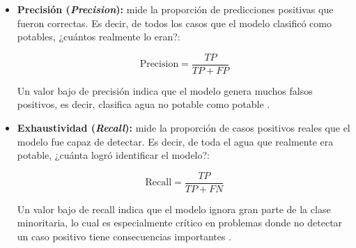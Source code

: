 \begin{itemize}
    \item \textbf{Precisión (\textit{Precision}):} mide la proporción
          de predicciones positivas que fueron correctas. Es decir,
          de todos los casos que el modelo clasificó como potables,
          ¿cuántos realmente lo eran?:

          \begin{equation}
              \text{Precision} = \frac{TP}{TP + FP}
          \end{equation}

          Un valor bajo de precisión indica que el modelo genera muchos
          falsos positivos, es decir, clasifica agua no potable como
          potable \parencite{japkowicz2002}.

    \item \textbf{Exhaustividad (\textit{Recall}):} mide la proporción
          de casos positivos reales que el modelo fue capaz de detectar.
          Es decir, de toda el agua que realmente era potable, ¿cuánta
          logró identificar el modelo?:

          \begin{equation}
              \text{Recall} = \frac{TP}{TP + FN}
          \end{equation}

          Un valor bajo de recall indica que el modelo ignora gran parte
          de la clase minoritaria, lo cual es especialmente crítico en
          problemas donde no detectar un caso positivo tiene consecuencias
          importantes \parencite{japkowicz2002}.
\end{itemize}
